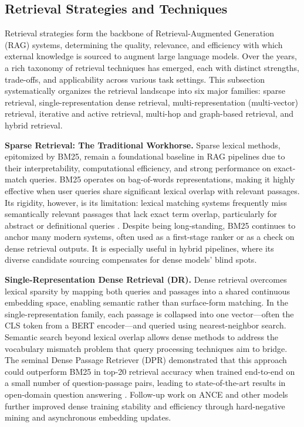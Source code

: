 \documentclass[11pt]{article}
\begin{document}
\subsection{Retrieval Strategies and Techniques}

Retrieval strategies form the backbone of Retrieval-Augmented Generation (RAG) systems, determining the quality, relevance, and efficiency with which external knowledge is sourced to augment large language models. Over the years, a rich taxonomy of retrieval techniques has emerged, each with distinct strengths, trade-offs, and applicability across various task settings. This subsection systematically organizes the retrieval landscape into six major families: sparse retrieval, single-representation dense retrieval, multi-representation (multi-vector) retrieval, iterative and active retrieval, multi-hop and graph-based retrieval, and hybrid retrieval.

\textbf{Sparse Retrieval: The Traditional Workhorse.} Sparse lexical methods, epitomized by BM25, remain a foundational baseline in RAG pipelines due to their interpretability, computational efficiency, and strong performance on exact-match queries. BM25 operates on bag-of-words representations, making it highly effective when user queries share significant lexical overlap with relevant passages. Its rigidity, however, is its limitation: lexical matching systems frequently miss semantically relevant passages that lack exact term overlap, particularly for abstract or definitional queries \cite{ref11,ref12}. Despite being long-standing, BM25 continues to anchor many modern systems, often used as a first-stage ranker or as a check on dense retrieval outputs. It is especially useful in hybrid pipelines, where its diverse candidate sourcing compensates for dense models' blind spots.

\textbf{Single-Representation Dense Retrieval (DR).} Dense retrieval overcomes lexical sparsity by mapping both queries and passages into a shared continuous embedding space, enabling semantic rather than surface-form matching. In the single-representation family, each passage is collapsed into one vector---often the CLS token from a BERT encoder---and queried using nearest-neighbor search. Semantic search beyond lexical overlap allows dense methods to address the vocabulary mismatch problem that query processing techniques aim to bridge. The seminal Dense Passage Retriever (DPR) \cite{ref12} demonstrated that this approach could outperform BM25 in top-20 retrieval accuracy when trained end-to-end on a small number of question-passage pairs, leading to state-of-the-art results in open-domain question answering \cite{ref12}. Follow-up work on ANCE and other models further improved dense training stability and efficiency through hard-negative mining and asynchronous embedding updates.
\end{document}

